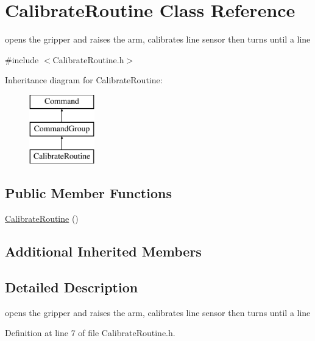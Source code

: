 \hypertarget{classCalibrateRoutine}{\section{Calibrate\-Routine Class Reference}
\label{classCalibrateRoutine}
}


opens the gripper and raises the arm, calibrates line sensor then turns until a line  




{\ttfamily \#include $<$Calibrate\-Routine.\-h$>$}

Inheritance diagram for Calibrate\-Routine\-:\begin{figure}[H]
\begin{center}
\leavevmode
\includegraphics[height=3.000000cm]{classCalibrateRoutine}
\end{center}
\end{figure}
\subsection*{Public Member Functions}
\begin{DoxyCompactItemize}
\item 
\hyperlink{classCalibrateRoutine_ab748a49d319d415cbaa59a192afd4a27}{Calibrate\-Routine} ()
\end{DoxyCompactItemize}
\subsection*{Additional Inherited Members}


\subsection{Detailed Description}
opens the gripper and raises the arm, calibrates line sensor then turns until a line 

Definition at line 7 of file Calibrate\-Routine.\-h.




